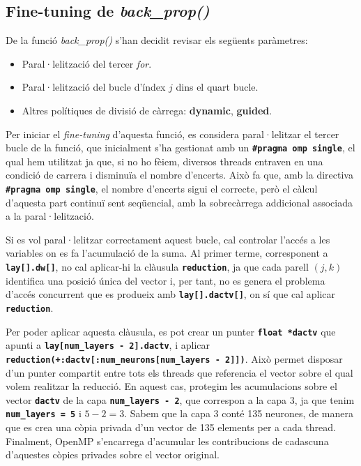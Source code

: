 \documentclass{article}
\begin{document}
\subsection{Fine-tuning de \textit{back\_prop()}}

De la funció \textit{back\_prop()} s'han decidit revisar els següents paràmetres:

\begin{itemize}
    \item Paral·lelització del tercer \textit{for}.
    \item Paral·lelització del bucle d'índex $j$ dins el quart bucle.
    \item Altres polítiques de divisió de càrrega: \textbf{dynamic}, \textbf{guided}.
\end{itemize}

\bigskip

\noindent Per iniciar el \textit{fine-tuning} d'aquesta funció, es considera paral·lelitzar el tercer bucle de la funció, que inicialment s'ha gestionat amb un \textbf{\texttt{\#pragma omp single}}, el qual hem utilitzat ja que, si no ho fèiem, diversos threads entraven en una condició de carrera i disminuïa el nombre d'encerts. Això fa que, amb la directiva \textbf{\texttt{\#pragma omp single}}, el nombre d'encerts sigui el correcte, però el càlcul d'aquesta part continuï sent seqüencial, amb la sobrecàrrega addicional associada a la paral·lelització.

\bigskip

\noindent Si es vol paral·lelitzar correctament aquest bucle, cal controlar l'accés a les variables on es fa l'acumulació de la suma. Al primer terme, corresponent a \textbf{\texttt{lay[].dw[]}}, no cal aplicar-hi la clàusula \textbf{\texttt{reduction}}, ja que cada parell $(j,k)$ identifica una posició única del vector i, per tant, no es genera el problema d'accés concurrent que es produeix amb \textbf{\texttt{lay[].dactv[]}}, on sí que cal aplicar \textbf{\texttt{reduction}}.

\bigskip

\noindent Per poder aplicar aquesta clàusula, es pot crear un punter \textbf{\texttt{float *dactv}} que apunti a \textbf{\texttt{lay[num\_layers - 2].dactv}}, i aplicar \textbf{\texttt{reduction(+:dactv[:num\_neurons[num\_layers - 2]])}}. Això permet disposar d'un punter compartit entre tots els threads que referencia el vector sobre el qual volem realitzar la reducció. En aquest cas, protegim les acumulacions sobre el vector \textbf{\texttt{dactv}} de la capa \textbf{\texttt{num\_layers - 2}}, que correspon a la capa 3, ja que tenim \textbf{\texttt{num\_layers = 5}} i $5-2=3$. Sabem que la capa 3 conté 135 neurones, de manera que es crea una còpia privada d'un vector de 135 elements per a cada thread. Finalment, OpenMP s'encarrega d'acumular les contribucions de cadascuna d'aquestes còpies privades sobre el vector original.
\end{document}
